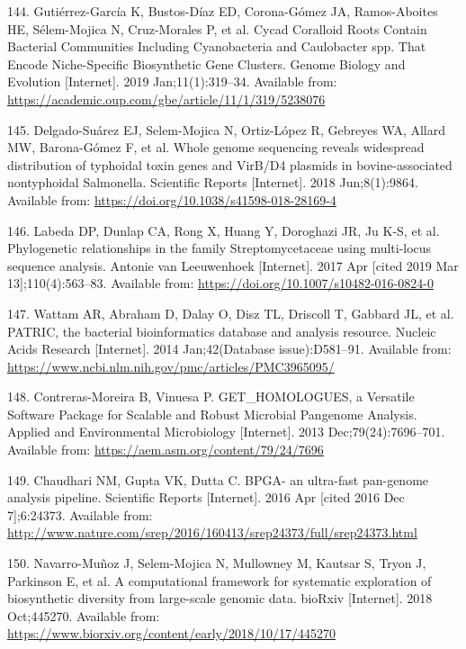 \documentclass[12pt,twoside]{reedthesis}
\begin{document}
  \hypertarget{ref-gutierrez-garcia_cycad_2019}{}
  144. Gutiérrez-García K, Bustos-Díaz ED, Corona-Gómez JA, Ramos-Aboites
  HE, Sélem-Mojica N, Cruz-Morales P, et al. Cycad Coralloid Roots Contain
  Bacterial Communities Including Cyanobacteria and Caulobacter spp. That
  Encode Niche-Specific Biosynthetic Gene Clusters. Genome Biology and
  Evolution {[}Internet{]}. 2019 Jan;11(1):319--34. Available from:
  \url{https://academic.oup.com/gbe/article/11/1/319/5238076}
  
  \hypertarget{ref-delgado-suarez_whole_2018}{}
  145. Delgado-Suárez EJ, Selem-Mojica N, Ortiz-López R, Gebreyes WA,
  Allard MW, Barona-Gómez F, et al. Whole genome sequencing reveals
  widespread distribution of typhoidal toxin genes and VirB/D4 plasmids in
  bovine-associated nontyphoidal Salmonella. Scientific Reports
  {[}Internet{]}. 2018 Jun;8(1):9864. Available from:
  \url{https://doi.org/10.1038/s41598-018-28169-4}
  
  \hypertarget{ref-labeda_phylogenetic_2017}{}
  146. Labeda DP, Dunlap CA, Rong X, Huang Y, Doroghazi JR, Ju K-S, et al.
  Phylogenetic relationships in the family Streptomycetaceae using
  multi-locus sequence analysis. Antonie van Leeuwenhoek {[}Internet{]}.
  2017 Apr {[}cited 2019 Mar 13{]};110(4):563--83. Available from:
  \url{https://doi.org/10.1007/s10482-016-0824-0}
  
  \hypertarget{ref-wattam_patric_2014}{}
  147. Wattam AR, Abraham D, Dalay O, Disz TL, Driscoll T, Gabbard JL, et
  al. PATRIC, the bacterial bioinformatics database and analysis resource.
  Nucleic Acids Research {[}Internet{]}. 2014 Jan;42(Database
  issue):D581--91. Available from:
  \url{https://www.ncbi.nlm.nih.gov/pmc/articles/PMC3965095/}
  
  \hypertarget{ref-contreras-moreira_get_homologues_2013}{}
  148. Contreras-Moreira B, Vinuesa P. GET\_HOMOLOGUES, a Versatile
  Software Package for Scalable and Robust Microbial Pangenome Analysis.
  Applied and Environmental Microbiology {[}Internet{]}. 2013
  Dec;79(24):7696--701. Available from:
  \url{https://aem.asm.org/content/79/24/7696}
  
  \hypertarget{ref-chaudhari_bpga-_2016}{}
  149. Chaudhari NM, Gupta VK, Dutta C. BPGA- an ultra-fast pan-genome
  analysis pipeline. Scientific Reports {[}Internet{]}. 2016 Apr {[}cited
  2016 Dec 7{]};6:24373. Available from:
  \url{http://www.nature.com/srep/2016/160413/srep24373/full/srep24373.html}
  
  \hypertarget{ref-navarro-munoz_computational_2018}{}
  150. Navarro-Muñoz J, Selem-Mojica N, Mullowney M, Kautsar S, Tryon J,
  Parkinson E, et al. A computational framework for systematic exploration
  of biosynthetic diversity from large-scale genomic data. bioRxiv
  {[}Internet{]}. 2018 Oct;445270. Available from:
  \url{https://www.biorxiv.org/content/early/2018/10/17/445270}
  
\end{document}
